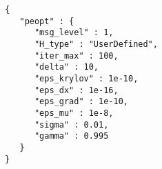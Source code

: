 \begin{lstlisting}[style=json,caption={PEOpt uses this input specification to minimize the constrained problem specified in Listing \ref{lst:simpleCon}.  We explain this specification Chapter \ref{ch:Input}.},label=lst:simpleConJSON]
{
   "peopt" : {
      "msg_level" : 1,
      "H_type" : "UserDefined",
      "iter_max" : 100,
      "delta" : 10,
      "eps_krylov" : 1e-10,
      "eps_dx" : 1e-16,
      "eps_grad" : 1e-10,
      "eps_mu" : 1e-8,
      "sigma" : 0.01,
      "gamma" : 0.995
   }
}
\end{lstlisting}
